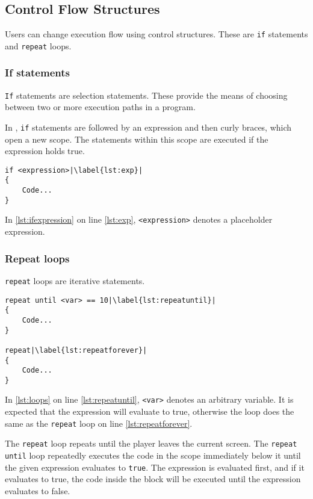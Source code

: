 \subsection{Control Flow Structures}
Users can change execution flow using control structures. These are \texttt{if} statements and \texttt{repeat} loops.
\subsubsection{If statements}
\texttt{If} statements are selection statements. These provide the means of choosing between two or more execution paths in a program\cite{sebesta_concepts_2016}.

In \dazel{}, \texttt{if} statements are followed by an expression and then curly braces, which open a new scope. The statements within this scope are executed if the expression holds true.

\begin{lstlisting}[language=CSharp, caption={Example of an if statement}, label={lst:ifexpression},escapechar=|]
if <expression>|\label{lst:exp}|
{
    Code...
}
\end{lstlisting}

In \ref{lst:ifexpression} on line \ref{lst:exp},  \verb|<expression>| denotes a placeholder expression.

\subsubsection{Repeat loops}
\texttt{repeat} loops are iterative statements.

\begin{lstlisting}[caption={Example of loops}, label={lst:loops},escapechar=|]
repeat until <var> == 10|\label{lst:repeatuntil}|
{
    Code...
}

repeat|\label{lst:repeatforever}|
{
    Code...
}
\end{lstlisting}

In \ref{lst:loops} on line \ref{lst:repeatuntil}, \verb|<var>| denotes an arbitrary variable. It is expected that the expression will evaluate to true, otherwise the loop does the same as the \verb|repeat| loop on line \ref{lst:repeatforever}.

The \verb|repeat| loop repeats until the player leaves the current screen.
The \verb|repeat until| loop repeatedly executes the code in the scope immediately below it until the given expression evaluates to \verb|true|.
The expression is evaluated first, and if it evaluates to true, the code inside the block will be executed until the expression evaluates to false.